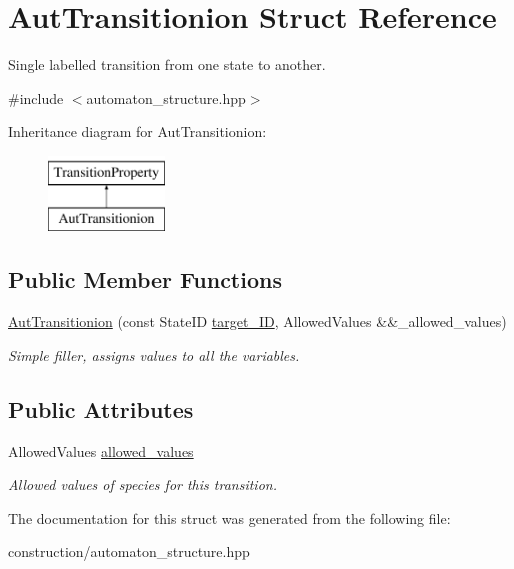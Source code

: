 \hypertarget{structAutTransitionion}{\section{\-Aut\-Transitionion \-Struct \-Reference}
\label{structAutTransitionion}
}


\-Single labelled transition from one state to another.  




{\ttfamily \#include $<$automaton\-\_\-structure.\-hpp$>$}

\-Inheritance diagram for \-Aut\-Transitionion\-:\begin{figure}[H]
\begin{center}
\leavevmode
\includegraphics[height=2.000000cm]{structAutTransitionion}
\end{center}
\end{figure}
\subsection*{\-Public \-Member \-Functions}
\begin{DoxyCompactItemize}
\item 
\hypertarget{structAutTransitionion_a8ffa8981f3dc8cd2de51674fb5937828}{\hyperlink{structAutTransitionion_a8ffa8981f3dc8cd2de51674fb5937828}{\-Aut\-Transitionion} (const \-State\-I\-D \hyperlink{structTransitionProperty_a1e272cf5a26a0db442ac0fed5b797386}{target\-\_\-\-I\-D}, \-Allowed\-Values \&\&\-\_\-allowed\-\_\-values)}\label{structAutTransitionion_a8ffa8981f3dc8cd2de51674fb5937828}

\begin{DoxyCompactList}\small\item\em \-Simple filler, assigns values to all the variables. \end{DoxyCompactList}\end{DoxyCompactItemize}
\subsection*{\-Public \-Attributes}
\begin{DoxyCompactItemize}
\item 
\hypertarget{structAutTransitionion_a17e3d0000118d6464369ac61faf1d40e}{\-Allowed\-Values \hyperlink{structAutTransitionion_a17e3d0000118d6464369ac61faf1d40e}{allowed\-\_\-values}}\label{structAutTransitionion_a17e3d0000118d6464369ac61faf1d40e}

\begin{DoxyCompactList}\small\item\em \-Allowed values of species for this transition. \end{DoxyCompactList}\end{DoxyCompactItemize}


\-The documentation for this struct was generated from the following file\-:\begin{DoxyCompactItemize}
\item 
construction/automaton\-\_\-structure.\-hpp\end{DoxyCompactItemize}
